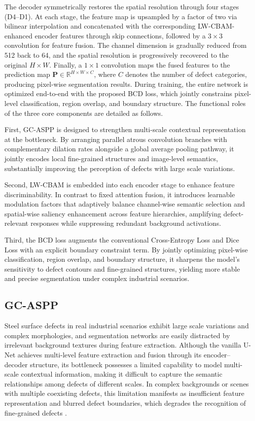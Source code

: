 \documentclass[sn-basic]{sn-jnl}
\theoremstyle{thmstyleone}%
\theoremstyle{thmstyletwo}%
\theoremstyle{thmstylethree}%
\begin{document}
The decoder symmetrically restores the spatial resolution through four stages (D4–D1). At each stage, the feature map is upsampled by a factor of two via bilinear interpolation and concatenated with the corresponding LW-CBAM-enhanced encoder features through skip connections, followed by a $3\times3$ convolution for feature fusion. The channel dimension is gradually reduced from 512 back to 64, and the spatial resolution is progressively recovered to the original $H\times W$. Finally, a $1\times1$ convolution maps the fused features to the prediction map $\mathbf{P}\in\mathbb{R}^{H\times W\times C}$, where $C$ denotes the number of defect categories, producing pixel-wise segmentation results. During training, the entire network is optimized end-to-end with the proposed BCD loss, which jointly constrains pixel-level classification, region overlap, and boundary structure. The functional roles of the three core components are detailed as follows.

First, GC-ASPP is designed to strengthen multi-scale contextual representation at the bottleneck. By arranging parallel atrous convolution branches with complementary dilation rates alongside a global average pooling pathway, it jointly encodes local fine-grained structures and image-level semantics, substantially improving the perception of defects with large scale variations.

Second, LW-CBAM is embedded into each encoder stage to enhance feature discriminability. In contrast to fixed attention fusion, it introduces learnable modulation factors that adaptively balance channel-wise semantic selection and spatial-wise saliency enhancement across feature hierarchies, amplifying defect-relevant responses while suppressing redundant background activations.

Third, the BCD loss augments the conventional Cross-Entropy Loss \cite{Mao2023Cross} and Dice Loss \cite{Kato2024Adaptive} with an explicit boundary constraint term. By jointly optimizing pixel-wise classification, region overlap, and boundary structure, it sharpens the model’s sensitivity to defect contours and fine-grained structures, yielding more stable and precise segmentation under complex industrial scenarios.


\subsection{GC-ASPP}

Steel surface defects in real industrial scenarios exhibit large scale variations and complex morphologies, and segmentation networks are easily distracted by irrelevant background textures during feature extraction. Although the vanilla U-Net achieves multi-level feature extraction and fusion through its encoder–decoder structure, its bottleneck possesses a limited capability to model multi-scale contextual information, making it difficult to capture the semantic relationships among defects of different scales. In complex backgrounds or scenes with multiple coexisting defects, this limitation manifests as insufficient feature representation and blurred defect boundaries, which degrades the recognition of fine-grained defects \cite{Ma2025ELA}.
\end{document}
